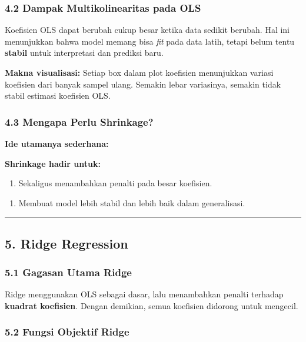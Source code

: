 \documentclass[12pt,a4paper]{article}
\begin{document}
\subsubsection{4.2 Dampak Multikolinearitas pada OLS}

Koefisien OLS dapat berubah cukup besar ketika data sedikit berubah. Hal ini menunjukkan bahwa model memang bisa \emph{fit} pada data latih, tetapi belum tentu \textbf{stabil} untuk interpretasi dan prediksi baru.


\textbf{Makna visualisasi:} Setiap box dalam plot koefisien menunjukkan variasi koefisien dari banyak sampel ulang. Semakin lebar variasinya, semakin tidak stabil estimasi koefisien OLS.


\subsubsection{4.3 Mengapa Perlu Shrinkage?}

\textbf{Ide utamanya sederhana:}


\textbf{Shrinkage hadir untuk:}

\begin{enumerate}
\item Sekaligus menambahkan penalti pada besar koefisien.
\end{enumerate}

\begin{enumerate}
\item Membuat model lebih stabil dan lebih baik dalam generalisasi.
\end{enumerate}


\hrule


\subsection{5. Ridge Regression}

\subsubsection{5.1 Gagasan Utama Ridge}

Ridge menggunakan OLS sebagai dasar, lalu menambahkan penalti terhadap \textbf{kuadrat koefisien}. Dengan demikian, semua koefisien didorong untuk mengecil.


\subsubsection{5.2 Fungsi Objektif Ridge}
\end{document}
